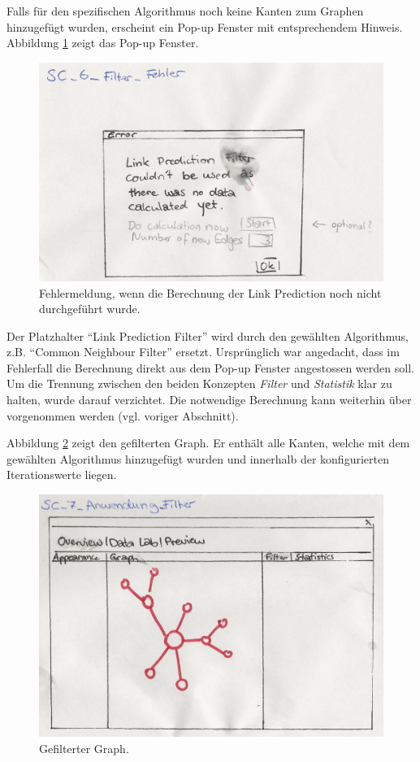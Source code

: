Falls für den spezifischen Algorithmus noch keine Kanten zum Graphen hinzugefügt wurden, erscheint ein Pop-up Fenster mit entsprechendem Hinweis.
Abbildung \ref{fig:screen6} zeigt das Pop-up Fenster.

\begin{figure}
    \includegraphics[width=\linewidth]{resources/SC-6.png}
    \caption{Fehlermeldung, wenn die Berechnung der Link Prediction noch nicht durchgeführt wurde.}
    \label{fig:screen6}
\end{figure}

Der Platzhalter ``Link Prediction Filter'' wird durch den gewählten Algorithmus, z.B. ``Common Neighbour Filter'' ersetzt.
Ursprünglich war angedacht, dass im Fehlerfall die Berechnung direkt aus dem Pop-up Fenster angestossen werden soll.
Um die Trennung zwischen den beiden Konzepten \textit{Filter} und \textit{Statistik} klar zu halten, wurde darauf verzichtet.
Die notwendige Berechnung kann weiterhin über  vorgenommen werden (vgl. voriger Abschnitt).

Abbildung \ref{fig:screen7} zeigt den gefilterten Graph. Er enthält alle Kanten, welche mit dem gewählten Algorithmus hinzugefügt wurden und
innerhalb der konfigurierten Iterationswerte liegen.

\begin{figure}
    \includegraphics[width=\linewidth]{resources/SC-7.png}
    \caption{Gefilterter Graph.}
    \label{fig:screen7}
\end{figure}


